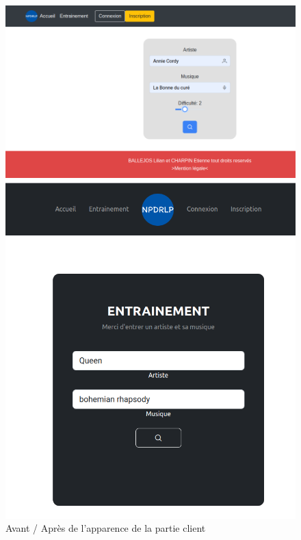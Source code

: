 \documentclass[12pt,french]{article}
\begin{document}
\begin{figure}[H]
	\centering
	\begin{minipage}{.5\textwidth}
		\centering
		\includegraphics[scale=0.25]{avantfront.png}
	\end{minipage}%
	\begin{minipage}{.5\textwidth}
		\centering
		\includegraphics[scale=0.25]{apresfront.png}
	\end{minipage}
	\caption{Avant / Après de l'apparence de la partie client}    
\end{figure}
\end{document}
